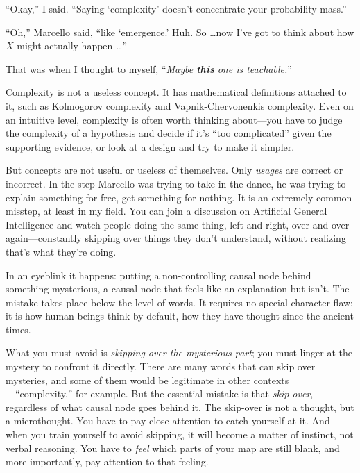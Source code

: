 {
 ``Okay,'' I said.
``Saying `complexity'
doesn't concentrate your probability
mass.''}

{
 ``Oh,'' Marcello said,
``like `emergence.'
Huh. So \ldots now I've got to think about how $X$ might
actually happen \ldots''}

{
 That was when I thought to myself,
``\textit{Maybe \textbf{this} one is
teachable.}''}

{
 Complexity is not a useless concept. It has mathematical
definitions attached to it, such as Kolmogorov complexity and
Vapnik-Chervonenkis complexity. Even on an intuitive level, complexity
is often worth thinking about---you have to judge the complexity of a
hypothesis and decide if it's ``too
complicated'' given the supporting evidence, or look
at a design and try to make it simpler.}

{
 But concepts are not useful or useless of themselves. Only
\textit{usages} are correct or incorrect. In the step Marcello was
trying to take in the dance, he was trying to explain something for
free, get something for nothing. It is an extremely common misstep, at
least in my field. You can join a discussion on Artificial General
Intelligence and watch people doing the same thing, left and right,
over and over again---constantly skipping over things they
don't understand, without realizing
that's what they're doing.}

{
 In an eyeblink it happens: putting a non-controlling causal node
behind something mysterious, a causal node that feels like an
explanation but isn't. The mistake takes place below
the level of words. It requires no special character flaw; it is how
human beings think by default, how they have thought since the ancient
times.}

{
 What you must avoid is \textit{skipping over the mysterious part};
you must linger at the mystery to confront it directly. There are many
words that can skip over mysteries, and some of them would be
legitimate in other
contexts---``complexity,'' for
example. But the essential mistake is that \textit{skip-over},
regardless of what causal node goes behind it. The skip-over is not a
thought, but a microthought. You have to pay close attention to catch
yourself at it. And when you train yourself to avoid skipping, it will
become a matter of instinct, not verbal reasoning. You have to
\textit{feel} which parts of your map are still blank, and more
importantly, pay attention to that feeling.}

